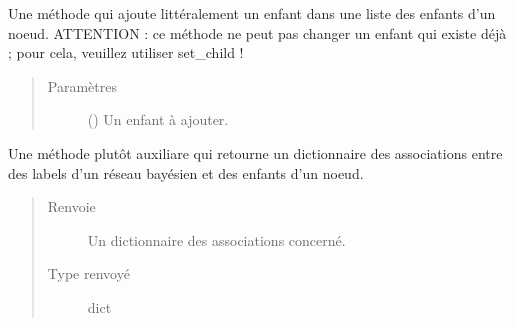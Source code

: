 \documentclass[letterpaper,10pt,french]{sphinxmanual}
\begin{document}
\begin{fulllineitems}
\begin{fulllineitems}
\begin{quote}
\begin{description}
\end{description}\end{quote}

\end{fulllineitems}


\begin{fulllineitems}
\label{\detokenize{index:StrategyTree.Repair.add_child}}
Une méthode qui ajoute littéralement un enfant dans une liste des enfants d’un noeud.
ATTENTION : ce méthode ne peut pas changer un enfant qui existe déjà ; pour cela, veuillez utiliser set\_child !
\begin{quote}\begin{description}
\item[{Paramètres}] \leavevmode
{} ({\hyperref[\detokenize{index:StrategyTree.NodeST}]{}}) \textendash{} Un enfant à ajouter.

\end{description}\end{quote}

\end{fulllineitems}


\begin{fulllineitems}
\label{\detokenize{index:StrategyTree.Repair.bn_labels_children_association}}
Une méthode plutôt auxiliare qui retourne un dictionnaire des associations entre des labels d’un réseau
bayésien et des enfants d’un noeud.
\begin{quote}\begin{description}
\item[{Renvoie}] \leavevmode
{} \textendash{} Un dictionnaire des associations concerné.

\item[{Type renvoyé}] \leavevmode
dict

\end{description}\end{quote}


\end{fulllineitems}
\end{fulllineitems}
\end{document}
